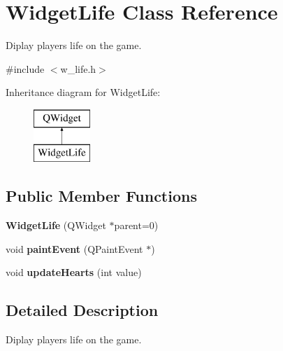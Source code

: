 \hypertarget{class_widget_life}{}\section{Widget\+Life Class Reference}
\label{class_widget_life}


Diplay player\textquotesingle{}s life on the game.  




{\ttfamily \#include $<$w\+\_\+life.\+h$>$}

Inheritance diagram for Widget\+Life\+:\begin{figure}[H]
\begin{center}
\leavevmode
\includegraphics[height=2.000000cm]{class_widget_life}
\end{center}
\end{figure}
\subsection*{Public Member Functions}
\begin{DoxyCompactItemize}
\item 
\hypertarget{class_widget_life_a1d39aa69bd9872b67d0e5164f0bb1ca8}{}{\bfseries Widget\+Life} (Q\+Widget $\ast$parent=0)\label{class_widget_life_a1d39aa69bd9872b67d0e5164f0bb1ca8}

\item 
\hypertarget{class_widget_life_ab41e1bce66c7891a9f6f64d42d4f6055}{}void {\bfseries paint\+Event} (Q\+Paint\+Event $\ast$)\label{class_widget_life_ab41e1bce66c7891a9f6f64d42d4f6055}

\item 
\hypertarget{class_widget_life_af27cf30c08d8a7a85e29a0a3e2fae0b0}{}void {\bfseries update\+Hearts} (int value)\label{class_widget_life_af27cf30c08d8a7a85e29a0a3e2fae0b0}

\end{DoxyCompactItemize}


\subsection{Detailed Description}
Diplay player\textquotesingle{}s life on the game. 

